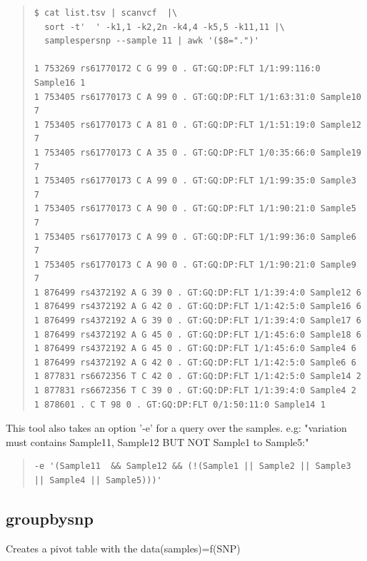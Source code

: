 \documentclass[12pt]{article}
\begin{document}
\begin{quote}
\begin{verbatim}
$ cat list.tsv | scanvcf  |\
  sort -t'  ' -k1,1 -k2,2n -k4,4 -k5,5 -k11,11 |\
  samplespersnp --sample 11 | awk '($8=".")'

1 753269 rs61770172 C G 99 0 . GT:GQ:DP:FLT 1/1:99:116:0 Sample16 1
1 753405 rs61770173 C A 99 0 . GT:GQ:DP:FLT 1/1:63:31:0 Sample10 7
1 753405 rs61770173 C A 81 0 . GT:GQ:DP:FLT 1/1:51:19:0 Sample12 7
1 753405 rs61770173 C A 35 0 . GT:GQ:DP:FLT 1/0:35:66:0 Sample19 7
1 753405 rs61770173 C A 99 0 . GT:GQ:DP:FLT 1/1:99:35:0 Sample3 7
1 753405 rs61770173 C A 90 0 . GT:GQ:DP:FLT 1/1:90:21:0 Sample5 7
1 753405 rs61770173 C A 99 0 . GT:GQ:DP:FLT 1/1:99:36:0 Sample6 7
1 753405 rs61770173 C A 90 0 . GT:GQ:DP:FLT 1/1:90:21:0 Sample9 7
1 876499 rs4372192 A G 39 0 . GT:GQ:DP:FLT 1/1:39:4:0 Sample12 6
1 876499 rs4372192 A G 42 0 . GT:GQ:DP:FLT 1/1:42:5:0 Sample16 6
1 876499 rs4372192 A G 39 0 . GT:GQ:DP:FLT 1/1:39:4:0 Sample17 6
1 876499 rs4372192 A G 45 0 . GT:GQ:DP:FLT 1/1:45:6:0 Sample18 6
1 876499 rs4372192 A G 45 0 . GT:GQ:DP:FLT 1/1:45:6:0 Sample4 6
1 876499 rs4372192 A G 42 0 . GT:GQ:DP:FLT 1/1:42:5:0 Sample6 6
1 877831 rs6672356 T C 42 0 . GT:GQ:DP:FLT 1/1:42:5:0 Sample14 2
1 877831 rs6672356 T C 39 0 . GT:GQ:DP:FLT 1/1:39:4:0 Sample4 2
1 878601 . C T 98 0 . GT:GQ:DP:FLT 0/1:50:11:0 Sample14 1
\end{verbatim}
\end{quote}

This tool also takes an option '-e' for a query over the samples. e.g: "variation must contains Sample11, Sample12 BUT NOT Sample1 to Sample5:"
\begin{quote}
\begin{verbatim}
-e '(Sample11  && Sample12 && (!(Sample1 || Sample2 || Sample3 || Sample4 || Sample5)))'
\end{verbatim}
\end{quote}

\subsection{groupbysnp}
Creates a pivot table with the data(samples)=f(SNP)
\end{document}
